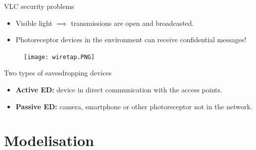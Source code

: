 \documentclass[aspectratio=169,xcolor=dvipsnames]{beamer}
\begin{document}
	\begin{frame}{VLC security problems}
		\begin{itemize}
			\item Visible light $\implies$ transmissions are open and broadcasted.
			\item Photoreceptor devices in the environment can receive confidential messages!
		\end{itemize}
		\begin{figure}[h!]
			\centering
			\texttt{[image: wiretap.PNG]}
		\end{figure}
		\begin{block}{Two types of eavesdropping devices}
			\begin{itemize}
				\item \textbf{Active ED:} device in direct communication with the access points.
				\item \textbf{Passive ED:} camera, smartphone or other photoreceptor not in the network.
			\end{itemize}
		\end{block}
	\end{frame}
	
	\section{Modelisation}
	
\end{document}
